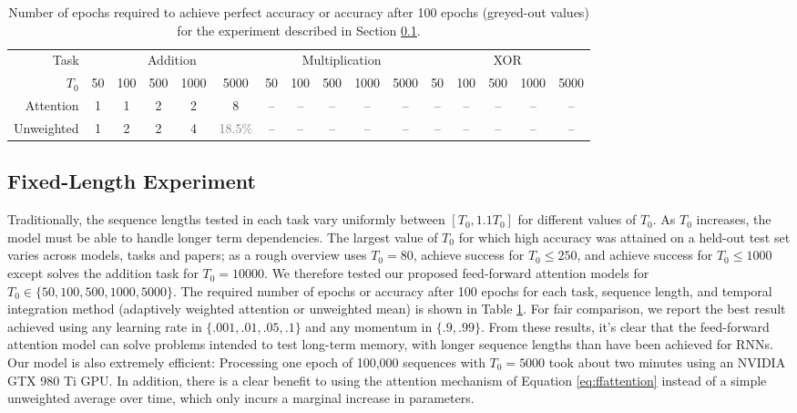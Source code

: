 \documentclass{article} %
\begin{document}
\begin{table}
  \centering
  \scriptsize
  \begin{tabular}{r c c c c c c c c c c c c c c c}
    \toprule
    Task & \multicolumn{5}{c}{Addition} & \multicolumn{5}{c}{Multiplication} & \multicolumn{5}{c}{XOR} \\
    $T_0$ & 50 & 100 & 500 & 1000 & 5000 & 50 & 100 & 500 & 1000 & 5000 & 50 & 100 & 500 & 1000 & 5000 \\
    \cmidrule(r){2-6}
    \cmidrule(r){7-11}
    \cmidrule(r){12-16}
    Attention & 1 & 1 & 2 & 2 & 8 & -- & -- & -- & -- & -- & -- & -- & -- & -- & -- \\
    Unweighted & 1 & 2 & 2 & 4 & \textcolor{gray}{18.5\%} & -- & -- & -- & -- & -- & -- & -- & -- & -- & -- \\
    \bottomrule
  \end{tabular}
  \caption{Number of epochs required to achieve perfect accuracy or accuracy after 100 epochs (greyed-out values) for the experiment described in Section \ref{sec:fixed}.}
  \label{tab:fixed}
\end{table}
\setlength{\textfloatsep}{10pt}

\subsection{Fixed-Length Experiment}
\label{sec:fixed}

Traditionally, the sequence lengths tested in each task vary uniformly between $[T_0, 1.1T_0]$ for different values of $T_0$.
As $T_0$ increases, the model must be able to handle longer term dependencies.
The largest value of $T_0$ for which high accuracy was attained on a held-out test set varies across models, tasks and papers; as a rough overview \cite{sutskever2013importance} uses $T_0 = 80$, \cite{le2015simple,martens2011learning} achieve success for $T_0 \le 250$, and \cite{jaegar2012long,hochreiter1997long} achieve success for $T_0 \le 1000$ except \cite{jaegar2012long} solves the addition task for $T_0 = 10000$.
We therefore tested our proposed feed-forward attention models for $T_0 \in \{50, 100, 500, 1000, 5000\}$.
The required number of epochs or accuracy after 100 epochs for each task, sequence length, and temporal integration method (adaptively weighted attention or unweighted mean) is shown in Table \ref{tab:fixed}.
For fair comparison, we report the best result achieved using any learning rate in $\{.001, .01, .05, .1\}$ and any momentum in $\{.9, .99\}$.
From these results, it's clear that the feed-forward attention model can solve problems intended to test long-term memory, with longer sequence lengths than have been achieved for RNNs.
Our model is also extremely efficient: Processing one epoch of 100,000 sequences with $T_0 = 5000$ took about two minutes using an NVIDIA GTX 980 Ti GPU.
In addition, there is a clear benefit to using the attention mechanism of Equation \ref{eq:ffattention} instead of a simple unweighted average over time, which only incurs a marginal increase in parameters.
\end{document}
